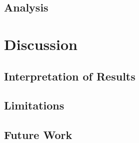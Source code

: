 \documentclass[11pt,a4paper]{article}
\begin{document}
\subsection{Analysis}
\label{subsec:analysis}


\section{Discussion}
\label{sec:discussion}


\subsection{Interpretation of Results}
\label{subsec:interpretation}


\subsection{Limitations}
\label{subsec:limitations}


\subsection{Future Work}
\label{subsec:future_work}
\end{document}

